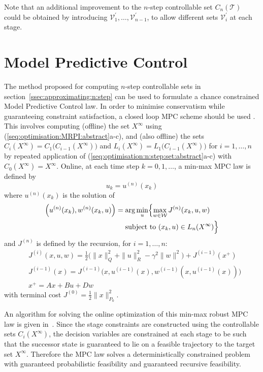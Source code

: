 \documentclass{ifacconf}
\providecommand{\W}{\mathcal W}
\providecommand{\V}{\mathcal V}
\providecommand{\T}{\mathcal T}
\begin{document}
Note that an additional improvement to the $n$-step controllable set $C_n(\T)$ could be obtained by introducing $\V_1^\prime,\dots,\V_{n-1}^\prime$, to allow different sets $\V_i^\prime$ at each stage.

\section{Model Predictive Control}\label{ssec:mpc}

The method proposed for computing $n$-step controllable sets in section~\ref{ssec:approximating:n:step} can be used to formulate a chance constrained Model Predictive Control law. In order to minimise conservatism while guaranteeing constraint satisfaction, a closed loop MPC scheme should be used \citep[see e.g.][]{Lee:1997}.
This involves computing (offline) the set $X^\infty$ using \mbox{(\ref{seq:optimisation:MRPI:abstract}a-c)}, and (also offline) the 
sets $C_{i}(X^\infty) = C_1\bigl(C_{i-1}(X^\infty)\bigr)$ and $L_{i}(X^\infty) = L_1\bigl(C_{i-1}(X^\infty)\bigr)$ 
for $i=1,\ldots,n$ by repeated application of (\ref{seq:optimisation:n:step:set:abstract}a-c) with $C_0(X^\infty)= X^\infty$.
Online, at each time step $k=0,1,\ldots$, a min-max MPC law is defined by 
\[
u_k = u^{(n)}(x_k)
\]
where $u^{(n)}(x_k)$ is the solution of
%
\[%
\begin{aligned}
\Bigl( u^{(n)} (x_k) , w^{(n)} (x_k,u) \Bigr) &= \arg \min_{u} \Bigl\{ \max_{w\in\W} J^{(n)}(x_k,u,w)  
\\
&\ \quad \text{subject to}\ (x_k, u) \in L_n(X^\infty)
\Bigr\}
\end{aligned}
\]%
and $J^{(n)}$ is defined by the recursion, for $i=1,\ldots,n$:
\begin{align*}
&J^{(i)}(x,u,w) = \tfrac{1}{2}\bigl( \| x \|^2_Q + \| u \|^2_R -
\gamma^2 \| w \|^2\bigr) + J^{(i-1)}(x^+) 
\\
&J^{(i-1)}(x) = J^{(i-1)}\bigl(x,u^{(i-1)}(x),w^{(i-1)}(x,u^{(i-1)}(x))\bigr) \\
&x^+ = Ax + Bu + Dw
\end{align*}
with terminal cost $J^{(0)} = \frac{1}{2}\|x\|_{P_0}^2$.

An algorithm for solving the online optimization of this min-max robust MPC law is given in~\citet{Buerger2016}. 
%
Since the stage constraints are constructed using the controllable sets $C_{i}(X^\infty)$, the decision variables are constrained at each stage to be such that the successor state is guaranteed to lie on a feasible trajectory to the target set $X^\infty$. Therefore the MPC law solves a deterministically constrained problem with guaranteed probabilistic feasibility and guaranteed recursive feasibility.
\end{document}

